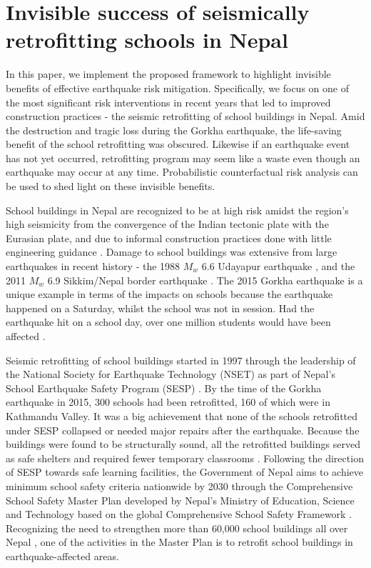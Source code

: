 \documentclass[utf8]{frontiersSCNS} %
\begin{document}
\section{Invisible success of seismically retrofitting schools in Nepal}
\label{section-retrofit-program}

In this paper, we implement the proposed framework to highlight invisible benefits of effective earthquake risk mitigation. Specifically, we focus on one of the most significant risk interventions in recent years that led to improved construction practices - the seismic retrofitting of school buildings in Nepal. Amid the destruction and tragic loss during the Gorkha earthquake, the life-saving benefit of the school retrofitting was obscured. Likewise if an earthquake event has not yet occurred, retrofitting program may seem like a waste even though an earthquake may occur at any time. Probabilistic counterfactual risk analysis can be used to shed light on these invisible benefits.

School buildings in Nepal are recognized to be at high risk amidst the region's high seismicity from the convergence of the Indian tectonic plate with the Eurasian plate, and due to informal construction practices done with little engineering guidance \citep{marasini2020}. Damage to school buildings was extensive from large earthquakes in recent history - the 1988 $M_{w}$ 6.6 Udayapur earthquake \citep{gupta1988report}, and the 2011 $M_{w}$ 6.9 Sikkim/Nepal border earthquake \citep{rai2012reconnaissance}. The 2015 Gorkha earthquake is a unique example in terms of the impacts on schools because the earthquake happened on a Saturday, whilst the school was not in session. Had the earthquake hit on a school day, over one million students would have been affected \citep{dixit2014public}.

Seismic retrofitting of school buildings started in 1997 through the leadership of the National Society for Earthquake Technology (NSET) as part of Nepal's School Earthquake Safety Program (SESP)  \citep{marasini_2019}. By the time of the Gorkha earthquake in 2015, 300 schools had been retrofitted, 160 of which were in Kathmandu Valley. It was a big achievement that none of the schools retrofitted under SESP collapsed or needed major repairs after the earthquake. Because the buildings were found to be structurally sound, all the retrofitted buildings served as safe shelters and required fewer temporary classrooms \citep{marasini_2019}. 
Following the direction of SESP towards safe learning facilities, the Government of Nepal aims to achieve minimum school safety criteria nationwide by 2030 through the Comprehensive School Safety Master Plan developed by Nepal's Ministry of Education, Science and Technology \citep{cehrdc2018} based on the global Comprehensive School Safety Framework \citep{unisdr2017}. Recognizing the need to strengthen more than 60,000 school buildings all over Nepal \citep{marasini2020}, one of the activities in the Master Plan is to retrofit school buildings in earthquake-affected areas.
\end{document}
